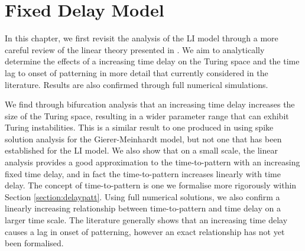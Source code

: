 \chapter{Fixed Delay Model}\label{section:fixdel}

In this chapter, we first revisit the analysis of the LI model through a more careful review of the linear theory presented in \cite{yigaffneyli,jiang}. We aim to analytically determine the effects of a increasing time delay on the Turing space and the time lag to onset of patterning in more detail that currently considered in the literature. Results are also confirmed through full numerical simulations.

We find through bifurcation analysis that an increasing time delay increases the size of the Turing space, resulting in a wider parameter range that can exhibit Turing instabilities. This is a similar result to one produced in \cite{fadai2} using spike solution analysis for the Gierer-Meinhardt model, but not one that has been established for the LI model. We also show that on a small scale, the linear analysis provides a good approximation to the time-to-pattern with an increasing fixed time delay, and in fact the time-to-pattern increases linearly with time delay. The concept of time-to-pattern is one we formalise more rigorously within Section \ref{section:delaypatt}. Using full numerical solutions, we also confirm a linearly increasing relationship between time-to-pattern and time delay on a larger time scale. The literature generally shows that an increasing time delay causes a lag in onset of patterning, however an exact relationship has not yet been formalised.

